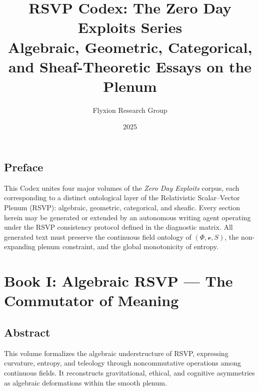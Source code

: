 \documentclass[12pt,oneside]{book}
\title{\textbf{RSVP Codex: The Zero Day Exploits Series}\\
\large Algebraic, Geometric, Categorical, and Sheaf-Theoretic Essays on the Plenum}
\author{Flyxion Research Group}
\date{2025}
\newcommand{\PhiField}{\ensuremath{\Phi}}
\newcommand{\vField}{\ensuremath{\boldsymbol{\mathcal{v}}}}
\newcommand{\SEntropy}{\ensuremath{S}}
\newcommand{\RSVPTriple}{\ensuremath{(\PhiField, \vField, \SEntropy)}}
\begin{document}
\frontmatter
\maketitle
\tableofcontents
\chapter*{Preface}

This Codex unites four major volumes of the \textit{Zero Day Exploits} corpus,
each corresponding to a distinct ontological layer of the Relativistic Scalar–Vector Plenum (RSVP):
algebraic, geometric, categorical, and sheafic.
Every section herein may be generated or extended by an autonomous writing agent
operating under the RSVP consistency protocol defined in the diagnostic matrix.
All generated text must preserve the continuous field ontology of \RSVPTriple,
the non-expanding plenum constraint, and the global monotonicity of entropy.


\newenvironment{botinstructions}{
\vspace{0.5em}
\noindent\textbf{Bot Instruction Protocol.}\begin{itemize}[leftmargin=2em]
}{
\end{itemize}\vspace{1em}
}


\mainmatter

\part{Book I: Algebraic RSVP — The Commutator of Meaning}

\chapter*{Abstract}
This volume formalizes the algebraic understructure of RSVP, expressing curvature,
entropy, and teleology through noncommutative operations among continuous fields.
It reconstructs gravitational, ethical, and cognitive asymmetries as algebraic deformations
within the smooth plenum.
\end{document}
